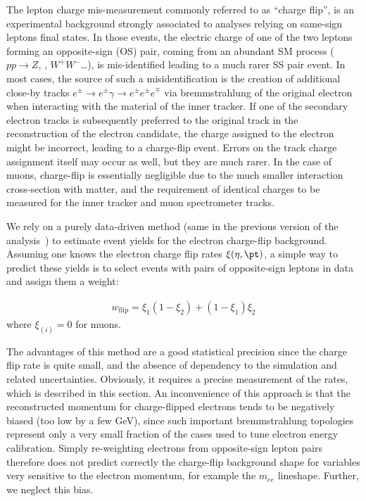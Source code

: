 The lepton charge mis-measurement commonly referred to as ``charge flip'', 
is an experimental background strongly associated to analyses relying on same-sign leptons final states. 
In those events, the electric charge of one of the two leptons forming an opposite-sign (OS) pair, 
coming from an abundant SM process ($pp\to Z$, \ttbar, $W^+W^-$\ldots), 
is mis-identified leading to a much rarer SS pair event.
In most cases, the source of such a misidentification 
is the creation of additional close-by tracks $e^\pm\to e^\pm\gamma\to e^\pm e^\pm e^\mp$ 
via bremmstrahlung of the original electron when interacting with the material of the inner tracker. 
If one of the secondary electron tracks is subsequently preferred to the original track in the reconstruction of the electron candidate, 
the charge assigned to the electron might be incorrect, leading to a charge-flip event. 
Errors on the track charge assignment itself may occur as well, but they are much rarer. 
In the case of muons, charge-flip is essentially negligible due to the much smaller interaction cross-section with matter, 
and the requirement of identical charges to be measured for the inner tracker and muon spectrometer tracks. 

We rely on a purely data-driven method (same in the previous version of the analysis~\cite{ATLAS-CONF-2016-037}) to estimate event yields for the electron charge-flip background. 
Assuming one knows the electron charge flip rates $\xi(\eta,\pt)$, 
a simple way to predict these yields is to select events with pairs of opposite-sign leptons in data and assign them a weight:

\begin{align}
w_\text{flip} = \xi_1(1-\xi_2) + (1-\xi_1)\xi_2
\label{eqn:chargeflip_weight}
\end{align}
where $\xi_{(i)}=0$ for muons.

The advantages of this method are a good statistical precision since the charge flip rate is quite small, 
and the absence of dependency to the simulation and related uncertainties. 
Obviously, it requires a precise measurement of the rates, which is described in this section. 
An inconvenience of this approach is that the reconstructed momentum for charge-flipped electrons  
tends to be negatively biased (too low by a few GeV), 
since such important bremmstrahlung topologies represent only 
a very small fraction of the cases used to tune electron energy calibration. 
Simply re-weighting electrons from opposite-sign lepton pairs therefore does not predict correctly 
the charge-flip background shape for variables very sensitive to the electron momentum, for example the $m_{ee}$ lineshape. 
Further, we neglect this bias. 

